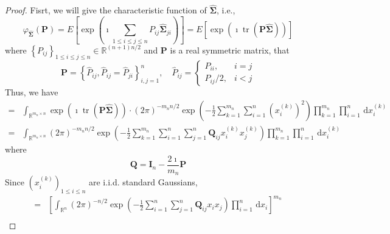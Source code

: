 \begin{proof}
    Fisrt, we will give the characteristic function of $\widehat{\boldsymbol{\Sigma}}$, i.e.,
    \begin{equation*}
        \varphi_{\widehat{\boldsymbol{\Sigma}}}\left(\mathbf{P}\right)=E\left[\exp\left(\imath\sum_{1\leq i\leq j\leq n}P_{ij}\widehat{\boldsymbol{\Sigma}}_{ji}\right)\right]=E\left[\exp\left(\imath\operatorname{tr}\left(\mathbf{P}\widehat{\boldsymbol{\Sigma}}\right)\right)\right]
    \end{equation*}
    where $\left\{P_{ij}\right\}_{1\leq i\leq j\leq n}\in\mathbb{R}^{(n+1)n/2}$ and $\mathbf{P}$ is a real symmetric matrix, that
    \begin{equation*}
        \mathbf{P}=\left\{\widehat{P}_{ij},\widehat{P}_{ij}=\widehat{P}_{ji}\right\}_{i,j=1}^{n},\quad\widehat{P}_{ij}=\begin{cases}P_{ii}, & i=j \\ P_{ij} / 2, & i<j \end{cases}
    \end{equation*}
    Thus, we have
    \begin{equation*}
        \begin{aligned}
            = & \int_{\mathbb{R}^{m_{n}\times n}}\exp\left(\imath\operatorname{tr}\left(\mathbf{P}\widehat{\boldsymbol{\Sigma}}\right)\right)\cdot(2\pi)^{-m_{n}n/2}\exp\left(-\frac{1}{2}\sum_{k=1}^{m_{n}}\sum_{i=1}^{n}\left(x_{i}^{(k)}\right)^{2}\right)\prod_{k=1}^{m_{n}}\prod_{i=1}^{n}\,\mathrm{d}x_{i}^{(k)} \\
            = & \int_{\mathbb{R}^{m_{n}\times n}}(2\pi)^{-m_{n}n/2}\exp\left(-\frac{1}{2}\sum_{k=1}^{m_{n}}\sum_{i=1}^{n}\sum_{j=1}^{n}\mathbf{Q}_{ij}x_{i}^{(k)}x_{j}^{(k)}\right)\prod_{k=1}^{m_{n}}\prod_{i=1}^{n}\,\mathrm{d}x_{i}^{(k)}
        \end{aligned}
    \end{equation*}
    where
    \begin{equation*}
        \mathbf{Q}=\mathbf{I}_{n}-\frac{2\imath}{m_{n}}\mathbf{P}
    \end{equation*}
    Since $\left(x_{i}^{(k)}\right)_{1\leq i\leq n}$ are i.i.d. standard Gaussians,
    \begin{equation*}
        \begin{aligned}
            = & \left[\int_{\mathbb{R}^{n}}(2\pi)^{-n/2}\exp\left(-\frac{1}{2}\sum_{i=1}^{n}\sum_{j=1}^{n}\mathbf{Q}_{ij}x_{i}x_{j}\right)\prod_{i=1}^{n}\,\mathrm{d}x_{i}\right]^{m_{n}}                                                                                                                         \\

\end{aligned}
\end{equation*}
\end{proof}
